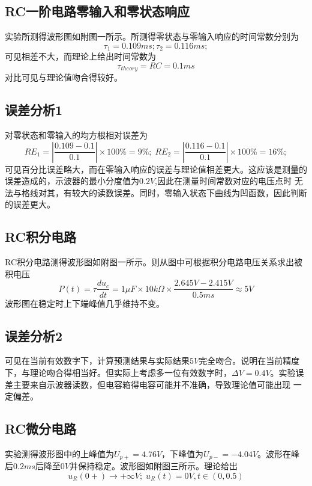 \documentclass[a4paper,11pt,UTF8]{ctexart}
\begin{document}
\subsection{RC一阶电路零输入和零状态响应}
实验所测得波形图如附图一所示。所测得零状态与零输入响应的时间常数分别为
\begin{equation}
  \tau_1=0.109ms;\tau_2=0.116ms;
\label{eqa:timeConstant}
\end{equation}
可见相差不大，而理论上给出时间常数为
\begin{equation}
  \tau_{theory}=RC=0.1ms
\end{equation}
对比可见与理论值吻合得较好。
\subsection{误差分析1}
对零状态和零输入的均方根相对误差为
\begin{equation}
  RE_1=\left|\frac{0.109-0.1}{0.1}\right|\times100\%=9\%;\;
  RE_2=\left|\frac{0.116-0.1}{0.1}\right|\times100\%=16\%;
\end{equation}
可见百分比误差略大，而在零输入响应的误差与理论值相差更大。这应该是测量的误差造成的，示波器的最小分度值为$0.2V$,因此在测量时间常数对应的电压点时
无法与格线对其，有较大的读数误差。同时，零输入状态下曲线为凹函数，因此判断的误差更大。
\subsection{RC积分电路}
RC积分电路测得波形图如附图一所示。则从图中可根据积分电路电压关系求出被积电压
\begin{equation}
  P(t)=\tau \frac{d u_{c}}{dt}=1\mu F\times10k\Omega\times\frac{2.645V-2.415V}{0.5ms}\approx5V
\end{equation}
波形图在稳定时上下端峰值几乎维持不变。
\subsection{误差分析2}
可见在当前有效数字下，计算预测结果与实际结果$5V$完全吻合。说明在当前精度下，与理论吻合得相当好。但实际上考虑多一位有效数字时，$\Delta V=0.4V$。实验误差主要来自示波器读数，但电容箱得电容可能并不准确，导致理论值可能出现
一定偏差。
\subsection{RC微分电路}
实验测得波形图中的上峰值为$U_{p+}=4.76V$，下峰值为$U_{p-}=-4.04V$。波形在峰后$0.2ms$后降至$0V$并保持稳定。波形图如附图三所示。理论给出
\begin{equation}
  u_R(0+)\rightarrow+\infty V;\; u_R(t)=0V,t\in(0,0.5)
\end{equation}
\end{document}
